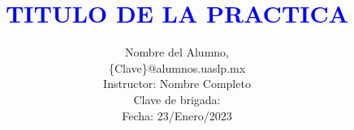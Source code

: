 \documentclass[journal]{IEEEtran}
\begin{document}
\title{\textcolor{blue}{TITULO DE LA PRACTICA}}      
\author{Nombre del Alumno,\\
		\{Clave\}@alumnos.uaslp.mx\\
		Instructor: Nombre Completo\\
        Clave de brigada:          \\
        Fecha: 23/Enero/2023\\
} 
\maketitle





\ifCLASSOPTIONcaptionsoff
  \newpage
\fi


\end{document}
